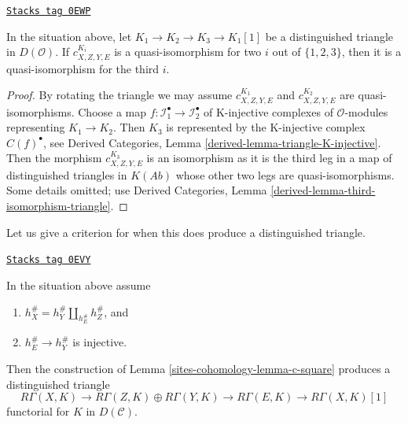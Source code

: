 \begin{lemma}
\label{sites-cohomology-lemma-two-out-of-three-blow-up-square}
\href{https://stacks.math.columbia.edu/tag/0EWP}{\texttt{Stacks tag 0EWP}}

In the situation above, let $K_1 \to K_2 \to K_3 \to K_1[1]$ be a distinguished
triangle in $D(\mathcal{O})$.
If $c^{K_i}_{X, Z, Y, E}$ is a quasi-isomorphism for
two $i$ out of $\{1, 2, 3\}$, then it is a quasi-isomorphism
for the third $i$.
\end{lemma}

\begin{proof}
By rotating the triangle we may assume $c^{K_1}_{X, Z, Y, E}$ and
$c^{K_2}_{X, Z, Y, E}$ are quasi-isomorphisms. Choose a map
$f : \mathcal{I}^\bullet_1 \to \mathcal{I}^\bullet_2$ of
K-injective complexes of $\mathcal{O}$-modules representing $K_1 \to K_2$.
Then $K_3$ is represented by the K-injective complex
$C(f)^\bullet$, see
Derived Categories, Lemma \ref{derived-lemma-triangle-K-injective}.
Then the morphism $c^{K_3}_{X, Z, Y, E}$ is an isomorphism
as it is the third leg in a map of distinguished triangles
in $K(\textit{Ab})$ whose other two legs are quasi-isomorphisms.
Some details omitted; use
Derived Categories, Lemma \ref{derived-lemma-third-isomorphism-triangle}.
\end{proof}

Let us give a criterion for when this does produce
a distinguished triangle.

\begin{lemma}
\label{sites-cohomology-lemma-square-triangle}
\href{https://stacks.math.columbia.edu/tag/0EVY}{\texttt{Stacks tag 0EVY}}

In the situation above assume
\begin{enumerate}
\item $h_X^\# = h_Y^\# \amalg_{h_E^\#} h_Z^\#$, and
\item $h_E^\# \to h_Y^\#$ is injective.
\end{enumerate}
Then the construction of Lemma \ref{sites-cohomology-lemma-c-square}
produces a distinguished triangle
$$
R\Gamma(X, K) \to
R\Gamma(Z, K) \oplus
R\Gamma(Y, K) \to
R\Gamma(E, K) \to R\Gamma(X, K)[1]
$$
functorial for $K$ in $D(\mathcal{C})$.
\end{lemma}

